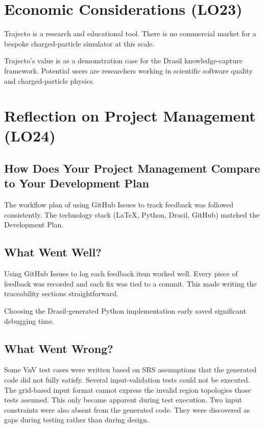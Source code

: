 \documentclass{article}
\begin{document}
\section{Economic Considerations (LO23)}

Trajecto is a research and educational tool.
There is no commercial market for a bespoke charged-particle simulator
at this scale.

Trajecto's value is as a demonstration case for the Drasil
knowledge-capture framework.
Potential users are researchers working in scientific software quality
and charged-particle physics.

\section{Reflection on Project Management (LO24)}

\subsection{How Does Your Project Management Compare to Your Development Plan}

The workflow plan of using GitHub Issues to track feedback was followed
consistently.
The technology stack (LaTeX, Python, Drasil, GitHub) matched the
Development Plan.

\subsection{What Went Well?}

Using GitHub Issues to log each feedback item worked well.
Every piece of feedback was recorded and each fix was tied to a commit.
This made writing the traceability sections straightforward.

Choosing the Drasil-generated Python implementation early saved
significant debugging time.

\subsection{What Went Wrong?}

Some VnV test cases were written based on SRS assumptions that the
generated code did not fully satisfy.
Several input-validation tests could not be executed.
The grid-based input format cannot express the invalid region topologies
those tests assumed.
This only became apparent during test execution.
Two input constraints were also absent from the generated code.
They were discovered as gaps during testing rather than during design.
\end{document}
